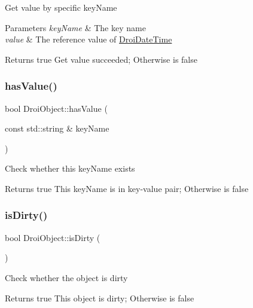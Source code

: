 Get value by specific key\+Name 
\begin{DoxyParams}{Parameters}
{\em key\+Name} & The key name \\
\hline
{\em value} & The reference value of \hyperlink{class_droi_date_time}{Droi\+Date\+Time} \\
\hline
\end{DoxyParams}
\begin{DoxyReturn}{Returns}
true Get value succeeded; Otherwise is false 
\end{DoxyReturn}
\mbox{\label{class_droi_object_a6b501c82a56dd1ca67bc3b488e808565}} 
\subsubsection{\texorpdfstring{has\+Value()}{hasValue()}}
{\footnotesize\ttfamily bool Droi\+Object\+::has\+Value (\begin{DoxyParamCaption}\item[{const std\+::string \&}]{key\+Name }\end{DoxyParamCaption})}

Check whether this key\+Name exists \begin{DoxyReturn}{Returns}
true This key\+Name is in key-\/value pair; Otherwise is false 
\end{DoxyReturn}
\mbox{\label{class_droi_object_a2d9b767f0c14e203a71b48b6b5d21b79}} 
\subsubsection{\texorpdfstring{is\+Dirty()}{isDirty()}}
{\footnotesize\ttfamily bool Droi\+Object\+::is\+Dirty (\begin{DoxyParamCaption}{ }\end{DoxyParamCaption})}

Check whether the object is dirty \begin{DoxyReturn}{Returns}
true This object is dirty; Otherwise is false 
\end{DoxyReturn}
\mbox{\label{class_droi_object_ac9bf5e770979e063460ee5a8bb0da738}} 
